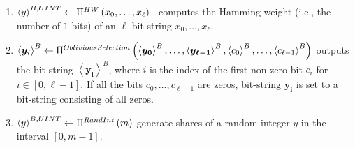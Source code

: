 \begin{enumerate}



      \item $\left\langle {y}\right\rangle ^{B,UINT}\gets \Uppi^{HW}\left(x_0,\ldots,x_{\ell}\right) $~\cite{boyar2008tight} computes the Hamming weight (i.e., the number of $1$ bits) of an $\ell$-bit string $x_0,\ldots,x_{\ell}$.

      \item $\left\langle \boldsymbol{y_i}\right\rangle ^{B}\gets \Uppi^{ObliviousSelection}\left(\left\langle \boldsymbol{y_0}\right\rangle^{B} ,\ldots,\left\langle \boldsymbol{y_{\ell-1}}\right\rangle^{B},\left\langle c_0\right\rangle ^B,\ldots,\left\langle c_{\ell-1}\right\rangle ^B\right) $ outputs the bit-string $\left\langle \boldsymbol{y_i}\right\rangle ^B$, where $i$ is the index of the first non-zero bit $c_{i}$ for $i\in \left[0,\ell-1\right] $. If all the bits $c_0, \ldots, c_{\ell-1}$ are zeros, bit-string $\boldsymbol{y_i} $ is set to a bit-string consisting of all zeros.

      \item $\left\langle {y}\right\rangle ^{B,UINT} \gets \Uppi^{RandInt}\left(m\right) $ generate shares of a random integer $y$ in the interval $ \left[0,m-1\right] $.


\end{enumerate}
